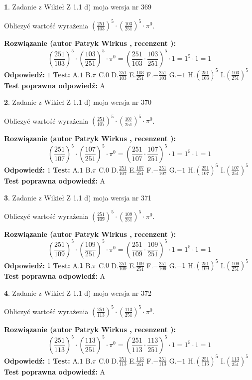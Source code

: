 \documentclass[12pt, a4paper]{article}
\theoremstyle{definition} %
\newtheorem{zad}{}
\newcommand{\zadStart}[1]{\begin{zad}#1\newline}
\newcommand{\zadStop}{\end{zad}}
\newcommand{\rozwStart}[2]{\noindent \textbf{Rozwiązanie (autor #1 , recenzent #2): }\newline}
\newcommand{\rozwStop}{\newline}
\newcommand{\odpStart}{\noindent \textbf{Odpowiedź:}\newline}
\newcommand{\odpStop}{\newline}
\newcommand{\testStart}{\noindent \textbf{Test:}\newline}
\newcommand{\testStop}{\newline}
\newcommand{\kluczStart}{\noindent \textbf{Test poprawna odpowiedź:}\newline}
\newcommand{\kluczStop}{\newline}
\begin{document}
\zadStart{Zadanie z Wikieł Z 1.1 d) moja wersja nr 369}

Obliczyć wartość wyrażenia $(\frac{251}{103})^{5} \cdot (\frac{103}{251})^{5} \cdot \pi^{0}$.
\zadStop
\rozwStart{Patryk Wirkus}{}
$$(\frac{251}{103})^{5} \cdot (\frac{103}{251})^{5} \cdot \pi^{0} = (\frac{251}{103} \cdot \frac{103}{251})^{5} \cdot 1 = 1^{5} \cdot 1 = 1$$
\rozwStop
\odpStart
$1$
\odpStop
\testStart
A.$1$ B.$\pi$ C.$0$ D.$\frac{251}{103}$ E.$\frac{103}{251}$
F.$-\frac{251}{103}$ G.$-1$
H.$(\frac{251}{103})^{5}$
I.$(\frac{103}{251})^{5}$
\testStop
\kluczStart
A
\kluczStop



\zadStart{Zadanie z Wikieł Z 1.1 d) moja wersja nr 370}

Obliczyć wartość wyrażenia $(\frac{251}{107})^{5} \cdot (\frac{107}{251})^{5} \cdot \pi^{0}$.
\zadStop
\rozwStart{Patryk Wirkus}{}
$$(\frac{251}{107})^{5} \cdot (\frac{107}{251})^{5} \cdot \pi^{0} = (\frac{251}{107} \cdot \frac{107}{251})^{5} \cdot 1 = 1^{5} \cdot 1 = 1$$
\rozwStop
\odpStart
$1$
\odpStop
\testStart
A.$1$ B.$\pi$ C.$0$ D.$\frac{251}{107}$ E.$\frac{107}{251}$
F.$-\frac{251}{107}$ G.$-1$
H.$(\frac{251}{107})^{5}$
I.$(\frac{107}{251})^{5}$
\testStop
\kluczStart
A
\kluczStop



\zadStart{Zadanie z Wikieł Z 1.1 d) moja wersja nr 371}

Obliczyć wartość wyrażenia $(\frac{251}{109})^{5} \cdot (\frac{109}{251})^{5} \cdot \pi^{0}$.
\zadStop
\rozwStart{Patryk Wirkus}{}
$$(\frac{251}{109})^{5} \cdot (\frac{109}{251})^{5} \cdot \pi^{0} = (\frac{251}{109} \cdot \frac{109}{251})^{5} \cdot 1 = 1^{5} \cdot 1 = 1$$
\rozwStop
\odpStart
$1$
\odpStop
\testStart
A.$1$ B.$\pi$ C.$0$ D.$\frac{251}{109}$ E.$\frac{109}{251}$
F.$-\frac{251}{109}$ G.$-1$
H.$(\frac{251}{109})^{5}$
I.$(\frac{109}{251})^{5}$
\testStop
\kluczStart
A
\kluczStop



\zadStart{Zadanie z Wikieł Z 1.1 d) moja wersja nr 372}

Obliczyć wartość wyrażenia $(\frac{251}{113})^{5} \cdot (\frac{113}{251})^{5} \cdot \pi^{0}$.
\zadStop
\rozwStart{Patryk Wirkus}{}
$$(\frac{251}{113})^{5} \cdot (\frac{113}{251})^{5} \cdot \pi^{0} = (\frac{251}{113} \cdot \frac{113}{251})^{5} \cdot 1 = 1^{5} \cdot 1 = 1$$
\rozwStop
\odpStart
$1$
\odpStop
\testStart
A.$1$ B.$\pi$ C.$0$ D.$\frac{251}{113}$ E.$\frac{113}{251}$
F.$-\frac{251}{113}$ G.$-1$
H.$(\frac{251}{113})^{5}$
I.$(\frac{113}{251})^{5}$
\testStop
\kluczStart
A
\kluczStop
\end{document}
